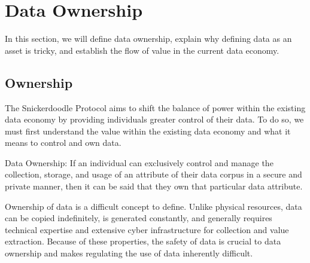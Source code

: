 \section{Data Ownership} 
\label{section:DataOwnership}


In this section, we will define data ownership, explain why defining data as an asset is tricky, and establish the flow of value in the current data economy.

\subsection{Ownership}


The Snickerdoodle Protocol aims to shift the balance of power within the existing data economy by providing individuals greater control of their data. 
To do so, we must first understand the value within the existing data economy and what it means to control and own data. 

\begin{definition}
\label{definition:DataOwnership}
Data Ownership: If an individual can exclusively control and manage the collection, storage, and usage of an attribute of their data corpus in a secure 
and private manner, then it can be said that they own that particular data attribute.
\end{definition}


Ownership of data is a difficult concept to define. Unlike physical resources, data can be copied indefinitely, is generated constantly, and generally requires 
technical expertise and extensive cyber infrastructure for collection and value extraction. Because of these properties, the safety of data is crucial to data ownership and 
makes regulating the use of data inherently difficult.

